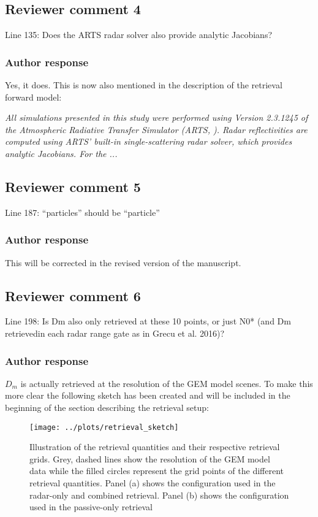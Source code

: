\documentclass[11pt]{scrartcl}
\begin{document}
\begin{itemize}
\subsection*{Reviewer comment 4}
Line 135: Does the ARTS radar solver also provide analytic Jacobians?

\subsubsection*{Author response}
Yes, it does. This is now also mentioned in the description of the retrieval forward model:

\textit{
All simulations presented in this study were performed using Version 2.3.1245 of
the Atmospheric Radiative Transfer Simulator (ARTS, \cite{arts18}). Radar
reflectivities are computed using ARTS' built-in single-scattering radar solver,
which provides analytic Jacobians. For the ...
}

\subsection*{Reviewer comment 5}
Line 187: “particles” should be “particle”

\subsubsection*{Author response}

This will be corrected in the revised version of the manuscript.


\subsection{Reviewer comment 6}
Line 198: Is Dm also only retrieved at these 10 points, or just N0* (and Dm retrievedin each radar range gate as in Grecu et al. 2016)?

\subsubsection*{Author response}

$D_m$ is actually retrieved at the resolution of the GEM model scenes. To make this more clear
the following sketch has been created and will be included in the beginning of the section
describing the retrieval setup:

\begin{figure}
\centering
\texttt{[image: ../plots/retrieval\_sketch]}
\caption{Illustration of the retrieval quantities and their respective retrieval
  grids. Grey, dashed lines show the resolution of the GEM model data while the
  filled circles represent the grid points of the different retrieval
  quantities. Panel (a) shows the configuration used in the radar-only and
  combined retrieval. Panel (b) shows the configuration used in the passive-only
  retrieval}
\label{fig:retrieval_sketch}
\end{figure}




\end{itemize}
\end{document}
